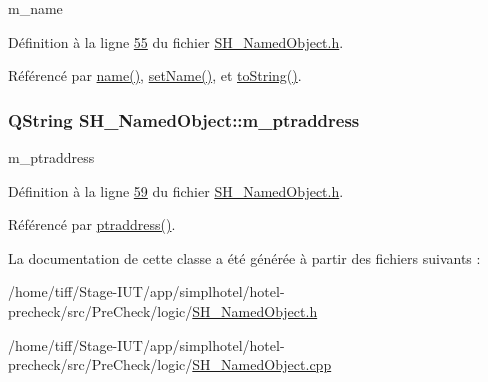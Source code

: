 m\-\_\-name 



Définition à la ligne \hyperlink{SH__NamedObject_8h_source_l00055}{55} du fichier \hyperlink{SH__NamedObject_8h_source}{S\-H\-\_\-\-Named\-Object.\-h}.



Référencé par \hyperlink{classSH__NamedObject_a9f686c6f2a5bcc08ad03d0cee0151f0f}{name()}, \hyperlink{classSH__NamedObject_a6bc164e6fa10ae190770529af75d1775}{set\-Name()}, et \hyperlink{classSH__NamedObject_a9f4b19df6a96a17daaf1060b3019ef47}{to\-String()}.

\hypertarget{classSH__NamedObject_acfc489299f90750082785bf9ac42f4ff}{
\subsubsection[{m\-\_\-ptraddress}]{\setlength{\rightskip}{0pt plus 5cm}Q\-String S\-H\-\_\-\-Named\-Object\-::m\-\_\-ptraddress\hspace{0.3cm}{\ttfamily [private]}}}\label{classSH__NamedObject_acfc489299f90750082785bf9ac42f4ff}


m\-\_\-ptraddress 



Définition à la ligne \hyperlink{SH__NamedObject_8h_source_l00059}{59} du fichier \hyperlink{SH__NamedObject_8h_source}{S\-H\-\_\-\-Named\-Object.\-h}.



Référencé par \hyperlink{classSH__NamedObject_a147d0e52d9f0fc1d3a423d02f82325f5}{ptraddress()}.



La documentation de cette classe a été générée à partir des fichiers suivants \-:\begin{DoxyCompactItemize}
\item 
/home/tiff/\-Stage-\/\-I\-U\-T/app/simplhotel/hotel-\/precheck/src/\-Pre\-Check/logic/\hyperlink{SH__NamedObject_8h}{S\-H\-\_\-\-Named\-Object.\-h}\item 
/home/tiff/\-Stage-\/\-I\-U\-T/app/simplhotel/hotel-\/precheck/src/\-Pre\-Check/logic/\hyperlink{SH__NamedObject_8cpp}{S\-H\-\_\-\-Named\-Object.\-cpp}\end{DoxyCompactItemize}
